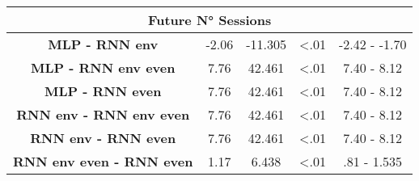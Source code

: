 \begin{table}[h]
\begin{tabular}{ccccc}
\multicolumn{5}{c}{\textbf{Future N° Sessions}}                                                                      \\ \hline
\textbf{MLP - RNN env} & -2.06                & -11.305     & \textless .01   & -2.42 - -1.70                     \\
\textbf{MLP - RNN env even}           & 7.76                & 42.461     & \textless .01   & 7.40 - 8.12                     \\
\textbf{MLP - RNN even}           & 7.76                & 42.461     & \textless .01   & 7.40 - 8.12                     \\
\textbf{RNN env - RNN env even}           & 7.76                & 42.461     & \textless .01   & 7.40 - 8.12                     \\
\textbf{RNN env - RNN even}           & 7.76                & 42.461     & \textless .01   & 7.40 - 8.12                     \\
\textbf{RNN env even - RNN even}          & 1.17                & 6.438     & \textless .01   & .81 - 1.535                    \\ \hline

\end{tabular}
\end{table}